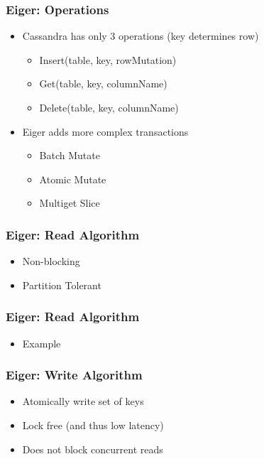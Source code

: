 \documentclass{beamer}
\begin{document}
\begin{frame}
\frametitle{Eiger: Operations}
\begin{itemize}
\pause \item Cassandra has only 3 operations (key determines row)
	\begin{itemize}
		\item Insert(table, key, rowMutation)
		\item Get(table, key, columnName)
		\item Delete(table, key, columnName)
	\end{itemize}
\pause \item Eiger adds more complex transactions
	\begin{itemize}
		\item Batch Mutate
		\item Atomic Mutate
		\item Multiget Slice
	\end{itemize}	
\end{itemize}  
\end{frame}

\begin{frame}
\frametitle{Eiger: Read Algorithm}
\begin{itemize}
\pause \item Non-blocking
\pause \item Partition Tolerant
\end{itemize}  
\end{frame}

\begin{frame}
\frametitle{Eiger: Read Algorithm}
\begin{itemize}
\pause \item Example
\end{itemize}  
\end{frame}

\begin{frame}
\frametitle{Eiger: Write Algorithm}
\begin{itemize}
\pause \item Atomically write set of keys
\pause \item Lock free (and thus low latency)
\pause \item Does not block concurrent reads
\end{itemize}  
\end{frame}
\end{document}
